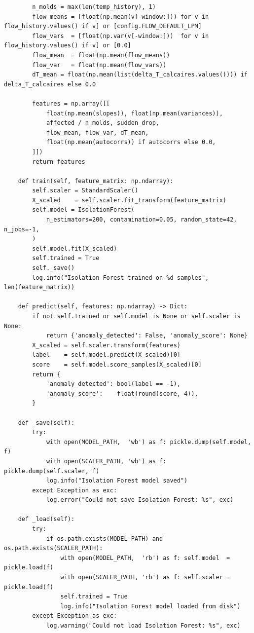 \begin{lstlisting}
        n_molds = max(len(temp_history), 1)
        flow_means = [float(np.mean(v[-window:])) for v in flow_history.values() if v] or [config.FLOW_DEFAULT_LPM]
        flow_vars  = [float(np.var(v[-window:]))  for v in flow_history.values() if v] or [0.0]
        flow_mean  = float(np.mean(flow_means))
        flow_var   = float(np.mean(flow_vars))
        dT_mean = float(np.mean(list(delta_T_calcaires.values()))) if delta_T_calcaires else 0.0

        features = np.array([[
            float(np.mean(slopes)), float(np.mean(variances)),
            affected / n_molds, sudden_drop,
            flow_mean, flow_var, dT_mean,
            float(np.mean(autocorrs)) if autocorrs else 0.0,
        ]])
        return features

    def train(self, feature_matrix: np.ndarray):
        self.scaler = StandardScaler()
        X_scaled    = self.scaler.fit_transform(feature_matrix)
        self.model = IsolationForest(
            n_estimators=200, contamination=0.05, random_state=42, n_jobs=-1,
        )
        self.model.fit(X_scaled)
        self.trained = True
        self._save()
        log.info("Isolation Forest trained on %d samples", len(feature_matrix))

    def predict(self, features: np.ndarray) -> Dict:
        if not self.trained or self.model is None or self.scaler is None:
            return {'anomaly_detected': False, 'anomaly_score': None}
        X_scaled = self.scaler.transform(features)
        label    = self.model.predict(X_scaled)[0]
        score    = self.model.score_samples(X_scaled)[0]
        return {
            'anomaly_detected': bool(label == -1),
            'anomaly_score':    float(round(score, 4)),
        }

    def _save(self):
        try:
            with open(MODEL_PATH,  'wb') as f: pickle.dump(self.model,  f)
            with open(SCALER_PATH, 'wb') as f: pickle.dump(self.scaler, f)
            log.info("Isolation Forest model saved")
        except Exception as exc:
            log.error("Could not save Isolation Forest: %s", exc)

    def _load(self):
        try:
            if os.path.exists(MODEL_PATH) and os.path.exists(SCALER_PATH):
                with open(MODEL_PATH,  'rb') as f: self.model  = pickle.load(f)
                with open(SCALER_PATH, 'rb') as f: self.scaler = pickle.load(f)
                self.trained = True
                log.info("Isolation Forest model loaded from disk")
        except Exception as exc:
            log.warning("Could not load Isolation Forest: %s", exc)
\end{lstlisting}

